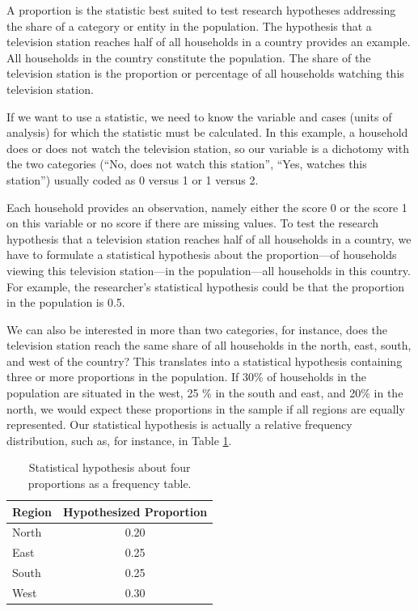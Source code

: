 \documentclass[a4paper]{book}
\theoremstyle{definition}
\theoremstyle{definition}
\theoremstyle{definition}
\theoremstyle{remark}
\begin{document}
A proportion is the statistic best suited to test research hypotheses
addressing the share of a category or entity in the population. The
hypothesis that a television station reaches half of all households in a
country provides an example. All households in the country constitute
the population. The share of the television station is the proportion or
percentage of all households watching this television station.

If we want to use a statistic, we need to know the variable and cases
(units of analysis) for which the statistic must be calculated. In this
example, a household does or does not watch the television station, so
our variable is a dichotomy with the two categories (``No, does not
watch this station'', ``Yes, watches this station'') usually coded as 0
versus 1 or 1 versus 2.

Each household provides an observation, namely either the score 0 or the
score 1 on this variable or no score if there are missing values. To
test the research hypothesis that a television station reaches half of
all households in a country, we have to formulate a statistical
hypothesis about the proportion---of households viewing this television
station---in the population---all households in this country. For
example, the researcher's statistical hypothesis could be that the
proportion in the population is 0.5.

We can also be interested in more than two categories, for instance,
does the television station reach the same share of all households in
the north, east, south, and west of the country? This translates into a
statistical hypothesis containing three or more proportions in the
population. If 30\% of households in the population are situated in the
west, 25 \% in the south and east, and 20\% in the north, we would
expect these proportions in the sample if all regions are equally
represented. Our statistical hypothesis is actually a relative frequency
distribution, such as, for instance, in Table \ref{tab:hypo-freq2}.

\begin{table}

\caption{\label{tab:hypo-freq2}Statistical hypothesis about four proportions as a frequency table.}
\centering
\fontsize{8}{8}\selectfont
\begin{tabular}[t]{lc}
\hline
Region & Hypothesized Proportion\\
\hline
North & 0.20\\
East & 0.25\\
South & 0.25\\
West & 0.30\\
\hline
\end{tabular}
\end{table}
\end{document}
